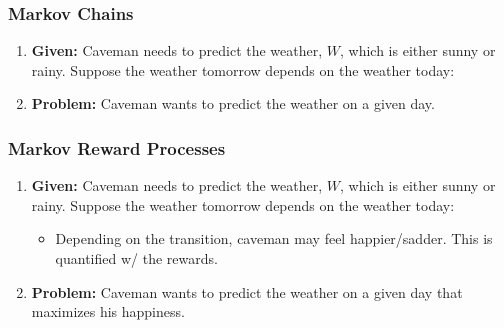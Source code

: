 \subsubsection{Markov Chains}
\begin{example}
    \begin{enumerate}
        \item \textbf{Given:} Caveman needs to predict the weather, $W$, which is either sunny or rainy. Suppose the weather tomorrow depends on the weather today:
        \item \textbf{Problem:} Caveman wants to predict the weather on a given day.
    \end{enumerate}
\end{example}

\subsubsection{Markov Reward Processes}
\begin{example}
    \begin{enumerate}
        \item \textbf{Given:} Caveman needs to predict the weather, $W$, which is either sunny or rainy. Suppose the weather tomorrow depends on the weather today:
        \begin{itemize}
            \item Depending on the transition, caveman may feel happier/sadder. This is quantified w/ the rewards.
        \end{itemize}
        \item \textbf{Problem:} Caveman wants to predict the weather on a given day that maximizes his happiness.
    \end{enumerate}
\end{example}
\newpage

